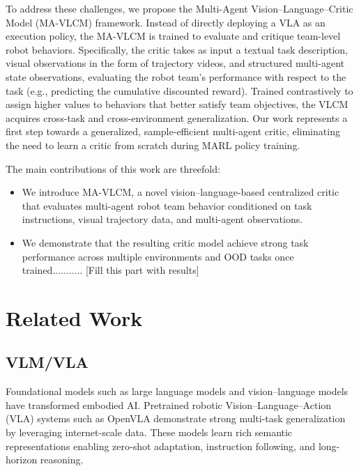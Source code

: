 \documentclass[letterpaper, 10 pt, conference]{ieeeconf}  %
\begin{document}
To address these challenges, we propose the Multi-Agent Vision–Language–Critic Model (MA-VLCM) framework. Instead of directly deploying a VLA as an execution policy, the MA-VLCM is trained to evaluate and critique team-level robot behaviors. Specifically, the critic takes as input a textual task description, visual observations in the form of trajectory videos, and structured multi-agent state observations, evaluating the robot team’s performance with respect to the task (e.g., predicting the cumulative discounted reward). Trained contrastively to assign higher values to behaviors that better satisfy team objectives, the VLCM acquires cross-task and cross-environment generalization. Our work represents a first step towards a generalized, sample-efficient multi-agent critic, eliminating the need to learn a critic from scratch during MARL policy training.

The main contributions of this work are threefold:
\begin{itemize}
    \item We introduce MA-VLCM, a novel vision–language-based centralized critic that evaluates multi-agent robot team behavior conditioned on task instructions, visual trajectory data, and multi-agent observations.
    \item We demonstrate that the resulting critic model achieve strong task performance across multiple environments and OOD tasks once trained........... [Fill this part with results]
    \end{itemize}


\section{Related Work}

\subsection{VLM/VLA}

Foundational models such as large language models \cite{driess2023palm} and vision–language models \cite{liu2023visual} have transformed embodied AI. Pretrained robotic Vision–Language–Action (VLA) systems such as OpenVLA \cite{kim24openvla} demonstrate strong multi-task generalization by leveraging internet-scale data. These models learn rich semantic representations enabling zero-shot adaptation, instruction following, and long-horizon reasoning.
\end{document}
